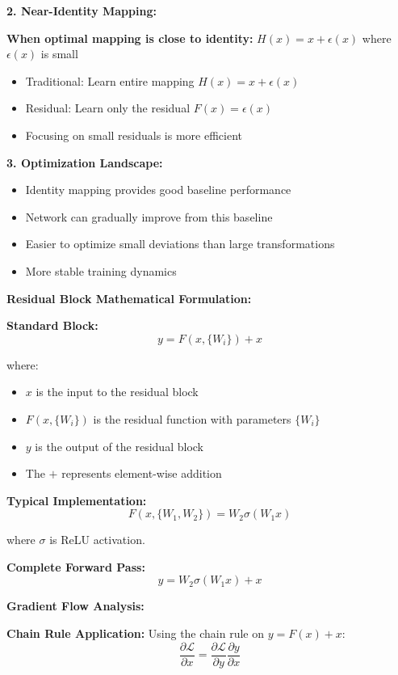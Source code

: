 \documentclass[12pt]{article}
\begin{document}
\begin{enumerate}[(a)]
{    \textbf{2. Near-Identity Mapping:}
    
    \textbf{When optimal mapping is close to identity:} $H(x) = x + \epsilon(x)$ where $\epsilon(x)$ is small
    \begin{itemize}
        \item Traditional: Learn entire mapping $H(x) = x + \epsilon(x)$
        \item Residual: Learn only the residual $F(x) = \epsilon(x)$
        \item Focusing on small residuals is more efficient
    \end{itemize}
    
    \textbf{3. Optimization Landscape:}
    \begin{itemize}
        \item Identity mapping provides good baseline performance
        \item Network can gradually improve from this baseline
        \item Easier to optimize small deviations than large transformations
        \item More stable training dynamics
    \end{itemize}
    
    \textbf{Residual Block Mathematical Formulation:}
    
    \textbf{Standard Block:}
    $$y = F(x, \{W_i\}) + x$$
    
    where:
    \begin{itemize}
        \item $x$ is the input to the residual block
        \item $F(x, \{W_i\})$ is the residual function with parameters $\{W_i\}$
        \item $y$ is the output of the residual block
        \item The $+$ represents element-wise addition
    \end{itemize}
    
    \textbf{Typical Implementation:}
    $$F(x, \{W_1, W_2\}) = W_2 \sigma(W_1 x)$$
    
    where $\sigma$ is ReLU activation.
    
    \textbf{Complete Forward Pass:}
    $$y = W_2 \sigma(W_1 x) + x$$
    
    \textbf{Gradient Flow Analysis:}
    
    \textbf{Chain Rule Application:}
    Using the chain rule on $y = F(x) + x$:
    $$\frac{\partial \mathcal{L}}{\partial x} = \frac{\partial \mathcal{L}}{\partial y} \frac{\partial y}{\partial x}$$
    
}
\end{enumerate}
\end{document}
